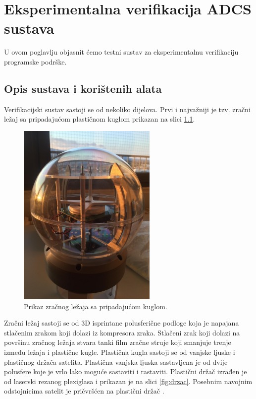 \documentclass[times, utf8, diplomski, numeric]{templates/template}
\begin{document}
\chapter{Eksperimentalna verifikacija ADCS sustava}{
    U ovom poglavlju objasnit ćemo testni sustav za eksperimentalnu verifikaciju programske podrške. 

    \section{Opis sustava i korištenih alata}{
    \label{section:opis_sustava_i_koristenih_alata}
        Verifikacijski sustav sastoji se od nekoliko dijelova. Prvi i najvažniji je tzv. zračni ležaj sa pripadajućom plastičnom kuglom prikazan na slici \ref{fig:fotka_zracni}.

        \begin{figure}[htb]
        \centering
        \includegraphics[width=0.6\textwidth]{images/fotka_zracni.jpg}
        \caption{Prikaz zračnog ležaja sa pripadajućom kuglom.}
        \label{fig:fotka_zracni}
        \end{figure}

        Zračni ležaj sastoji se od 3D isprintane polusferične podloge koja je napajana stlačenim zrakom koji dolazi iz kompresora zraka. Stlačeni zrak koji dolazi na površinu zračnog ležaja stvara tanki film zračne struje koji smanjuje trenje između ležaja i plastične kugle. Plastična kugla sastoji se od vanjske ljuske i plastičnog držača satelita. Plastična vanjska ljuska sastavljena je od dvije polusfere koje je vrlo lako moguće sastaviti i rastaviti. Plastični držač izrađen je od laserski rezanog plexiglasa i prikazan je na slici \ref{fig:drzac}. Posebnim navojnim odstojnicima satelit je pričvršćen na plastični držač \cite{zracni_lezaj}.

}}
\end{document}
